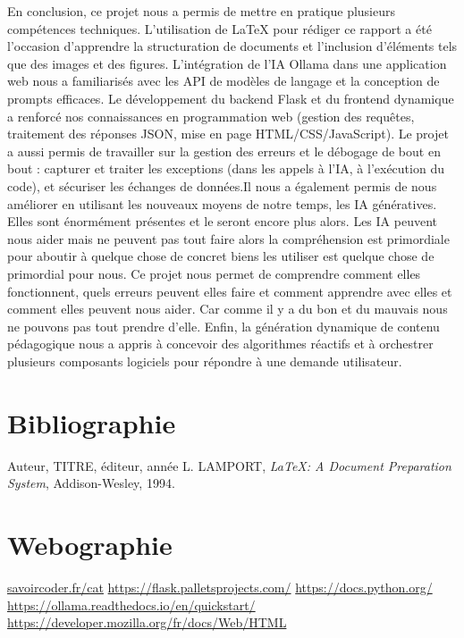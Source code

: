 \documentclass[a4paper, 12pt, twoside]{article}
\begin{document}
En conclusion, ce projet nous a permis de mettre en pratique plusieurs compétences techniques. L'utilisation de LaTeX pour rédiger ce rapport a été l'occasion d'apprendre la structuration de documents et l'inclusion d'éléments tels que des images et des figures. L'intégration de l'IA Ollama dans une application web nous a familiarisés avec les API de modèles de langage et la conception de prompts efficaces. Le développement du backend Flask et du frontend dynamique a renforcé nos connaissances en programmation web (gestion des requêtes, traitement des réponses JSON, mise en page HTML/CSS/JavaScript). Le projet a aussi permis de travailler sur la gestion des erreurs et le débogage de bout en bout : capturer et traiter les exceptions (dans les appels à l'IA, à l'exécution du code), et sécuriser les échanges de données.Il nous a également permis de nous améliorer en utilisant les nouveaux moyens de notre temps, les IA génératives. Elles sont énormément présentes et le seront encore plus alors. Les IA peuvent nous aider mais ne peuvent pas tout faire alors la compréhension est primordiale pour aboutir à quelque chose de concret biens les utiliser est quelque chose de primordial pour nous. Ce projet nous permet de comprendre comment elles fonctionnent, quels erreurs peuvent elles faire et comment apprendre avec elles et comment elles peuvent nous aider. Car comme il y a du bon et du mauvais nous ne pouvons pas tout prendre d’elle. Enfin, la génération dynamique de contenu pédagogique nous a appris à concevoir des algorithmes réactifs et à orchestrer plusieurs composants logiciels pour répondre à une demande utilisateur.


\section{Bibliographie}
\renewcommand{\bibname}{}
\renewcommand{\refname}{}
\begin{thebibliography}{2}
 Auteur, TITRE, éditeur, année
 L. LAMPORT, {\it \LaTeX: A Document Preparation System}, Addison-Wesley, 1994.
\end{thebibliography}

\newpage
\section{Webographie}
\begin{thebibliography}{2}
 \url{savoircoder.fr/cat}
 \url{https://flask.palletsprojects.com/}
 \url{https://docs.python.org/}
 \url{https://ollama.readthedocs.io/en/quickstart/}
 \url{https://developer.mozilla.org/fr/docs/Web/HTML}
\end{thebibliography}
\end{document}
